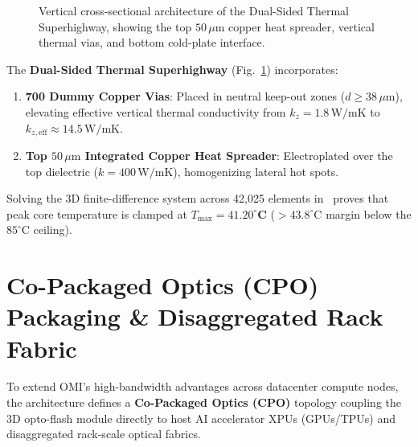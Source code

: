 \documentclass[journal]{IEEEtran}
\begin{document}
\begin{figure}[!t]
{
}
\caption{Vertical cross-sectional architecture of the Dual-Sided Thermal Superhighway, showing the top $50\,\mu\text{m}$ copper heat spreader, vertical thermal vias, and bottom cold-plate interface.}
\label{fig:thermal_cross_section}
\end{figure}

The \textbf{Dual-Sided Thermal Superhighway} (Fig.~\ref{fig:thermal_cross_section}) incorporates:
\begin{enumerate}
    \item \textbf{700 Dummy Copper Vias}: Placed in neutral keep-out zones ($d \ge 38\,\mu\text{m}$), elevating effective vertical thermal conductivity from $k_z = 1.8\,\text{W/mK}$ to $k_{z, \text{eff}} \approx 14.5\,\text{W/mK}$.
    \item \textbf{Top $50\,\mu\text{m}$ Integrated Copper Heat Spreader}: Electroplated over the top dielectric ($k = 400\,\text{W/mK}$), homogenizing lateral hot spots.
\end{enumerate}

Solving the 3D finite-difference system across 42,025 elements in~\cite{omi_sim_report} proves that peak core temperature is clamped at $T_{\max} = \mathbf{41.20^\circ\text{C}}$ ($>43.8^\circ\text{C}$ margin below the $85^\circ\text{C}$ ceiling).

\section{Co-Packaged Optics (CPO) Packaging \& Disaggregated Rack Fabric}
\label{sec:cpo_fabric}

To extend OMI's high-bandwidth advantages across datacenter compute nodes, the architecture defines a \textbf{Co-Packaged Optics (CPO)} topology coupling the 3D opto-flash module directly to host AI accelerator XPUs (GPUs/TPUs) and disaggregated rack-scale optical fabrics.
\end{document}
